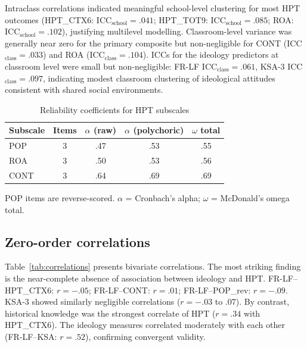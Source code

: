 \documentclass[pdflatex,sn-apa]{sn-jnl}%
\begin{document}
Intraclass correlations indicated meaningful school-level clustering for most HPT outcomes (HPT\_CTX6: ICC$_{\text{school}} = .041$; HPT\_TOT9: ICC$_{\text{school}} = .085$; ROA: ICC$_{\text{school}} = .102$), justifying multilevel modelling. Classroom-level variance was generally near zero for the primary composite but non-negligible for CONT (ICC$_{\text{class}} = .033$) and ROA (ICC$_{\text{class}} = .104$). ICCs for the ideology predictors at classroom level were small but non-negligible: FR-LF ICC$_{\text{class}} = .061$, KSA-3 ICC$_{\text{class}} = .097$, indicating modest classroom clustering of ideological attitudes consistent with shared social environments.

\begin{table}[ht]
\caption{Reliability coefficients for HPT subscales}\label{tab:reliability}
\begin{tabular*}{\textwidth}{@{\extracolsep\fill}lcccc}
\toprule
Subscale & Items & $\alpha$ (raw) & $\alpha$ (polychoric) & $\omega$ total \\
\midrule
POP & 3 & .47 & .53 & .55 \\
ROA & 3 & .50 & .53 & .56 \\
CONT & 3 & .64 & .69 & .69 \\
\bottomrule
\end{tabular*}
\begin{tablenotes}
\small
\item POP items are reverse-scored. $\alpha$ = Cronbach's alpha; $\omega$ = McDonald's omega total.
\end{tablenotes}
\end{table}

\subsection{Zero-order correlations}\label{subsec:correlations}

Table~\ref{tab:correlations} presents bivariate correlations. The most striking finding is the near-complete absence of association between ideology and HPT. FR-LF--HPT\_CTX6: $r = -.05$; FR-LF--CONT: $r = .01$; FR-LF--POP\_rev: $r = -.09$. KSA-3 showed similarly negligible correlations ($r = -.03$ to $.07$). By contrast, historical knowledge was the strongest correlate of HPT ($r = .34$ with HPT\_CTX6). The ideology measures correlated moderately with each other (FR-LF--KSA: $r = .52$), confirming convergent validity.
\end{document}
